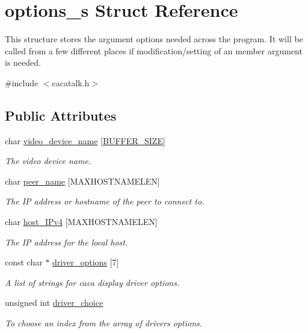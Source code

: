 \hypertarget{structoptions__s}{\section{options\-\_\-s \-Struct \-Reference}
\label{structoptions__s}
}


\-This structure stores the argument options needed across the program. \-It will be called from a few different places if modification/setting of an member argument is needed.  




{\ttfamily \#include $<$cacatalk.\-h$>$}

\subsection*{\-Public \-Attributes}
\begin{DoxyCompactItemize}
\item 
char \hyperlink{structoptions__s_a361e705ec36167283f446c42276b0daf}{video\-\_\-device\-\_\-name} \mbox{[}\hyperlink{cacatalk_8h_a6b20d41d6252e9871430c242cb1a56e7}{\-B\-U\-F\-F\-E\-R\-\_\-\-S\-I\-Z\-E}\mbox{]}
\begin{DoxyCompactList}\small\item\em \-The video device name. \end{DoxyCompactList}\item 
char \hyperlink{structoptions__s_a3bc5783f374ad410635b68a77c26e76d}{peer\-\_\-name} \mbox{[}\-M\-A\-X\-H\-O\-S\-T\-N\-A\-M\-E\-L\-E\-N\mbox{]}
\begin{DoxyCompactList}\small\item\em \-The \-I\-P address or hostname of the peer to connect to. \end{DoxyCompactList}\item 
char \hyperlink{structoptions__s_a6eae09fe8cfc8e82b1f9b683f4f3e982}{host\-\_\-\-I\-Pv4} \mbox{[}\-M\-A\-X\-H\-O\-S\-T\-N\-A\-M\-E\-L\-E\-N\mbox{]}
\begin{DoxyCompactList}\small\item\em \-The \-I\-P address for the local host. \end{DoxyCompactList}\item 
const char $\ast$ \hyperlink{structoptions__s_a74d98a4b0f31c22e05993a1bdef76afc}{driver\-\_\-options} \mbox{[}7\mbox{]}
\begin{DoxyCompactList}\small\item\em \-A list of strings for caca display driver options. \end{DoxyCompactList}\item 
unsigned int \hyperlink{structoptions__s_a23c963605bc84d66eedd18089502d8e4}{driver\-\_\-choice}
\begin{DoxyCompactList}\small\item\em \-To choose an index from the array of drivers options. \end{DoxyCompactList}\end{DoxyCompactItemize}


